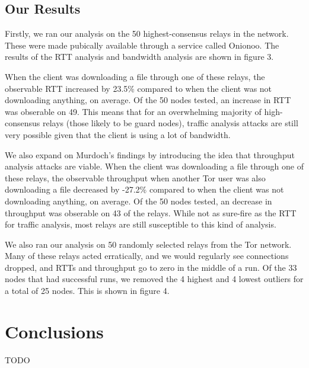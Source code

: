 \documentclass[12pt,journal]{IEEEtran}
\begin{document}
\subsection{Our Results}
Firstly, we ran our analysis on the 50 highest-consensus relays in the network. These were made pubically available through a service called Onionoo. The results of the RTT analysis and bandwidth analysis are shown in figure 3.

When the client was downloading a file through one of these relays, the observable RTT increased by 23.5\% compared to when the client was not downloading anything, on average. Of the 50 nodes tested, an increase in RTT was obserable on 49. This means that for an overwhelming majority of high-consensus relays (those likely to be guard nodes), traffic analysis attacks are still very possible given that the client is using a lot of bandwidth.

We also expand on Murdoch's findings by introducing the idea that throughput analysis attacks are viable. When the client was downloading a file through one of these relays, the observable throughput when another Tor user was also downloading a file decreased by -27.2\% compared to when the client was not downloading anything, on average. Of the 50 nodes tested, an decrease in throughput was obserable on 43 of the relays. While not as sure-fire as the RTT for traffic analysis, most relays are still susceptible to this kind of analysis.

We also ran our analysis on 50 randomly selected relays from the Tor network. Many of these relays acted erratically, and we would regularly see connections dropped, and RTTs and throughput go to zero in the middle of a run. Of the 33 nodes that had successful runs, we removed the 4 highest and 4 lowest outliers for a total of 25 nodes. This is shown in figure 4.



\section{Conclusions}
TODO
\printbibliography
\end{document}
